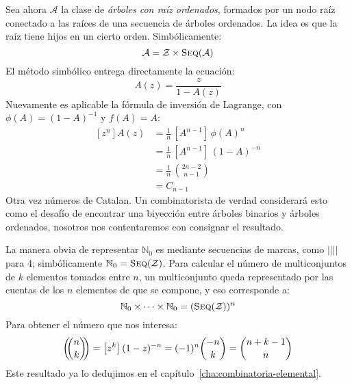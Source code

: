   Sea ahora \(\mathcal{A}\)
  la clase de \emph{árboles con raíz ordenados},%
  formados por un nodo raíz
  conectado a las raíces de una secuencia de árboles ordenados.
  La idea es que la raíz tiene hijos en un cierto orden.
  Simbólicamente:
  \begin{equation*}
    \mathcal{A}
      = \mathcal{Z} \times \operatorname{\textsc{Seq}}(\mathcal{A})
  \end{equation*}
  El método simbólico entrega directamente la ecuación:
  \begin{equation*}
    A(z)
      = \frac{z}{1 - A(z)}
  \end{equation*}
  Nuevamente es aplicable la fórmula de inversión de Lagrange,%
  con \(\phi(A) = (1 - A)^{-1}\) y \(f(A) = A\):
  \begin{align*}
    \left[ z^n \right] A(z)
      &= \frac{1}{n} \, \left[ A^{n - 1} \right] \, \phi(A)^n \\
      &= \frac{1}{n} \, \left[ A^{n - 1} \right] \, (1 - A)^{-n} \\
      &= \frac{1}{n} \, \binom{2 n - 2}{n - 1} \\
      &= C_{n - 1}
  \end{align*}
  Otra vez números de Catalan.%
  Un combinatorista de verdad considerará esto
  como el desafío de encontrar una biyección entre árboles binarios
  y árboles ordenados,
  nosotros nos contentaremos con consignar el resultado.

  La manera obvia de representar \(\mathbb{N}_0\)
  es mediante secuencias de marcas,
  como \(||||\) para 4;
  simbólicamente \(\mathbb{N}_0 = \operatorname{\textsc{Seq}}(\mathcal{Z})\).
  Para calcular el número de multiconjuntos de \(k\) elementos
  tomados entre \(n\),%
  un multiconjunto queda representado
  por las cuentas de los \(n\) elementos de que se compone,
  y eso corresponde a:
  \begin{equation*}
    \mathbb{N}_0 \times \dotsb \times \mathbb{N}_0
      = (\operatorname{\textsc{Seq}}(\mathcal{Z}))^n
  \end{equation*}
  Para obtener el número que nos interesa:
  \begin{equation*}
    \left( \!\! \binom{n}{k} \!\! \right)
      = \left[ z^k \right] (1 - z)^{-n}
      = (-1)^n \binom{-n}{k}
      = \binom{n + k - 1}{n}
  \end{equation*}
  Este resultado ya lo dedujimos
  en el capítulo~\ref{cha:combinatoria-elemental}.

